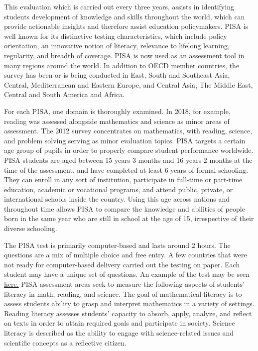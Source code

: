 This evaluation which is carried out every three years, assists in
identifying students development of knowledge and skills throughout the
world, which can provide actionable insights and therefore assist
education policymakers. PISA is well known for its distinctive testing
characteristics, which include policy orientation, an innovative notion
of literacy, relevance to lifelong learning, regularity, and breadth of
coverage. PISA is now used as an assessment tool in many regions around
the world. In addition to OECD member countries, the survey has been or
is being conducted in East, South and Southeast Asia, Central,
Mediterranean and Eastern Europe, and Central Asia, The Middle East,
Central and South America and Africa.

For each PISA, one domain is thoroughly examined. In 2018, for example,
reading was assessed alongside mathematics and science as minor areas of
assessment. The 2012 survey concentrates on mathematics, with reading,
science, and problem solving serving as minor evaluation topics. PISA
targets a certain age group of pupils in order to properly compare
student performance worldwide. PISA students are aged between 15 years 3
months and 16 years 2 months at the time of the assessment, and have
completed at least 6 years of formal schooling. They can enroll in any
sort of institution, participate in full-time or part-time education,
academic or vocational programs, and attend public, private, or
international schools inside the country. Using this age across nations
and throughout time allows PISA to compare the knowledge and abilities
of people born in the same year who are still in school at the age of
15, irrespective of their diverse schooling.

The PISA test is primarily computer-based and lasts around 2 hours. The
questions are a mix of multiple choice and free entry. A few countries
that were not ready for computer-based delivery carried out the testing
on paper. Each student may have a unique set of questions. An example of
the test may be seen \href{https://www.oecd.org/pisa/test/}{here.} PISA
assessment areas seek to measure the following aspects of students'
literacy in math, reading, and science. The goal of mathematical
literacy is to assess students ability to grasp and interpret
mathematics in a variety of settings. Reading literacy assesses
students' capacity to absorb, apply, analyze, and reflect on texts in
order to attain required goals and participate in society. Science
literacy is described as the ability to engage with science-related
issues and scientific concepts as a reflective citizen.

